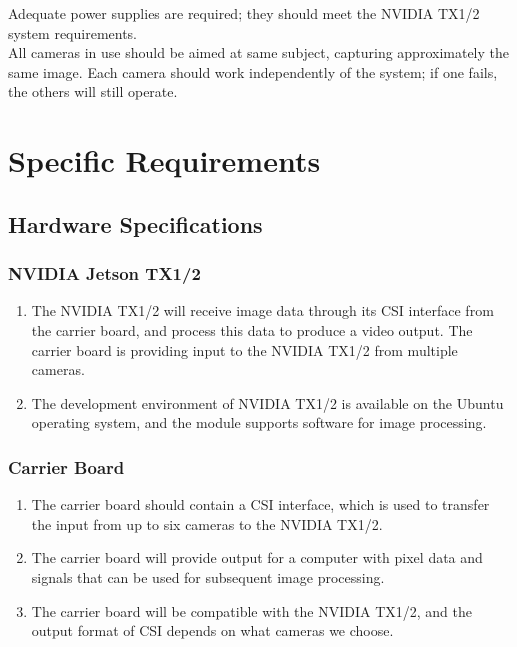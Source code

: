 \documentclass[letterpaper,10pt,serif,draftclsnofoot,onecolumn,compsoc,titlepage]{IEEEtran}
\begin{document}
Adequate power supplies are required; they should meet the NVIDIA TX1/2 system 
requirements. \\

All cameras in use should be aimed at same subject, capturing approximately the same 
image. Each camera should work independently of the system; if one fails, the others 
will still operate.\\

\section{Specific Requirements}

\subsection{Hardware Specifications}

\subsubsection{NVIDIA Jetson TX1/2}

\begin{enumerate}[label=\alph*]
	\item The NVIDIA TX1/2 will receive image data through its CSI interface from
	the carrier board, and process this data to produce a video output. The carrier
	board is providing input to the NVIDIA TX1/2 from multiple cameras. \\
	\item The development environment of NVIDIA TX1/2 is available on the Ubuntu operating system, and the module supports software for image processing.\\
\end{enumerate}

\subsubsection{Carrier Board}

\begin{enumerate}[label=\alph*]
	\item The carrier board should contain a CSI interface, which is used to transfer the
	input from up to six cameras to the NVIDIA TX1/2. \\
	\item The carrier board will provide output for a computer with pixel data and signals that 
	can be used for subsequent image processing.\\
	\item The carrier board will be compatible with the NVIDIA TX1/2, and the output format of 
	CSI depends on what cameras we choose.\\
\end{enumerate}
\end{document}
